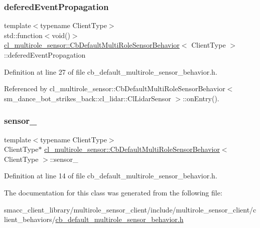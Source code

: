 \subsubsection{\texorpdfstring{defered\+Event\+Propagation}{deferedEventPropagation}}
{\footnotesize\ttfamily template$<$typename Client\+Type$>$ \\
std\+::function$<$void()$>$ \hyperlink{classcl__multirole__sensor_1_1CbDefaultMultiRoleSensorBehavior}{cl\+\_\+multirole\+\_\+sensor\+::\+Cb\+Default\+Multi\+Role\+Sensor\+Behavior}$<$ Client\+Type $>$\+::defered\+Event\+Propagation}



Definition at line 27 of file cb\+\_\+default\+\_\+multirole\+\_\+sensor\+\_\+behavior.\+h.



Referenced by cl\+\_\+multirole\+\_\+sensor\+::\+Cb\+Default\+Multi\+Role\+Sensor\+Behavior$<$ sm\+\_\+dance\+\_\+bot\+\_\+strikes\+\_\+back\+::cl\+\_\+lidar\+::\+Cl\+Lidar\+Sensor $>$\+::on\+Entry().

\mbox{\label{classcl__multirole__sensor_1_1CbDefaultMultiRoleSensorBehavior_a201893c3c859259eac3166405f3509cb}} 
\subsubsection{\texorpdfstring{sensor\+\_\+}{sensor\_}}
{\footnotesize\ttfamily template$<$typename Client\+Type$>$ \\
Client\+Type$\ast$ \hyperlink{classcl__multirole__sensor_1_1CbDefaultMultiRoleSensorBehavior}{cl\+\_\+multirole\+\_\+sensor\+::\+Cb\+Default\+Multi\+Role\+Sensor\+Behavior}$<$ Client\+Type $>$\+::sensor\+\_\+}



Definition at line 14 of file cb\+\_\+default\+\_\+multirole\+\_\+sensor\+\_\+behavior.\+h.



The documentation for this class was generated from the following file\+:\begin{DoxyCompactItemize}
\item 
smacc\+\_\+client\+\_\+library/multirole\+\_\+sensor\+\_\+client/include/multirole\+\_\+sensor\+\_\+client/client\+\_\+behaviors/\hyperlink{cb__default__multirole__sensor__behavior_8h}{cb\+\_\+default\+\_\+multirole\+\_\+sensor\+\_\+behavior.\+h}\end{DoxyCompactItemize}
